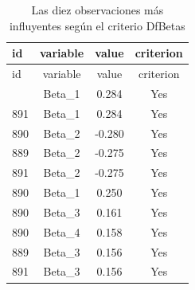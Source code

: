 \documentclass[
  spanish,
  12pt,
]{book}
\newenvironment{Shaded}{\begin{snugshade}}{\end{snugshade}}
\newcommand{\AttributeTok}[1]{\textcolor[rgb]{0.13,0.29,0.53}{#1}}
\newcommand{\DataTypeTok}[1]{\textcolor[rgb]{0.13,0.29,0.53}{#1}}
\newcommand{\DecValTok}[1]{\textcolor[rgb]{0.00,0.00,0.81}{#1}}
\newcommand{\FunctionTok}[1]{\textcolor[rgb]{0.13,0.29,0.53}{\textbf{#1}}}
\newcommand{\NormalTok}[1]{#1}
\newcommand{\OtherTok}[1]{\textcolor[rgb]{0.56,0.35,0.01}{#1}}
\newcommand{\SpecialCharTok}[1]{\textcolor[rgb]{0.81,0.36,0.00}{\textbf{#1}}}
\newcommand{\StringTok}[1]{\textcolor[rgb]{0.31,0.60,0.02}{#1}}
\begin{document}
\begin{Shaded}
\end{Shaded}

\begin{longtable}[]{@{}lccc@{}}
\caption{\label{tab:tab-dfbetas-influyentes}Las diez observaciones más influyentes según el criterio DfBetas}\tabularnewline
\toprule\noalign{}
id & variable & value & criterion \\
\midrule\noalign{}
\endfirsthead
\toprule\noalign{}
id & variable & value & criterion \\
\midrule\noalign{}
\endhead
\bottomrule\noalign{}
\endlastfoot
889 & Beta\_1 & 0.284 & Yes \\
891 & Beta\_1 & 0.284 & Yes \\
890 & Beta\_2 & -0.280 & Yes \\
889 & Beta\_2 & -0.275 & Yes \\
891 & Beta\_2 & -0.275 & Yes \\
890 & Beta\_1 & 0.250 & Yes \\
890 & Beta\_3 & 0.161 & Yes \\
890 & Beta\_4 & 0.158 & Yes \\
889 & Beta\_3 & 0.156 & Yes \\
891 & Beta\_3 & 0.156 & Yes \\
\end{longtable}
\end{document}
